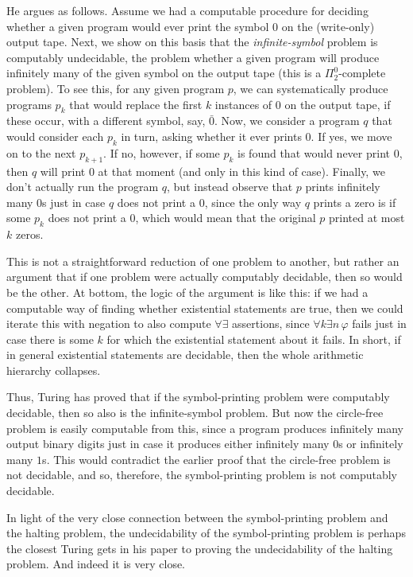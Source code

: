 \documentclass{amsart}
\begin{document}
He argues as follows. Assume we had a computable procedure for deciding whether a given program would ever print the symbol 0 on the (write-only) output tape. Next, we show on this basis that the \emph{infinite-symbol} problem is computably undecidable, the problem whether a given program will produce infinitely many of the given symbol on the output tape (this is a $\Pi^0_2$-complete problem). To see this, for any given program $p$, we can systematically produce programs $p_k$ that would replace the first $k$ instances of $0$ on the output tape, if these occur, with a different symbol, say, $\bar 0$. Now, we consider a program $q$ that  would consider each $p_k$ in turn, asking whether it ever prints $0$. If yes, we move on to the next $p_{k+1}$. If no, however, if some $p_k$ is found that would never print $0$, then $q$ will print 0 at that moment (and only in this kind of case). Finally, we don't actually run the program $q$, but instead observe that $p$ prints infinitely many 0s just in case $q$ does not print a $0$, since the only way $q$ prints a zero is if some $p_k$ does not print a $0$, which would mean that the original $p$ printed at most $k$ zeros. 

This is not a straightforward reduction of one problem to another, but rather an argument that if one problem were actually computably decidable, then so would be the other. At bottom, the logic of the argument is like this: if we had a computable way of finding whether existential statements are true, then we could iterate this with negation to also compute $\forall\exists$ assertions, since $\forall k\exists n\,\varphi$ fails just in case there is some $k$ for which the existential statement about it fails. In short, if in general existential statements are decidable, then the whole arithmetic hierarchy collapses. 

Thus, Turing has proved that if the symbol-printing problem were computably decidable, then so also is the infinite-symbol problem. But now the circle-free problem is easily computable from this, since a program produces infinitely many output binary digits just in case it produces either infinitely many $0$s or infinitely many $1$s. This would contradict the earlier proof that the circle-free problem is not decidable, and so, therefore, the symbol-printing problem is not computably decidable. 

In light of the very close connection between the symbol-printing problem and the halting problem, the undecidability of the symbol-printing problem is  perhaps the closest Turing gets in his paper to proving the undecidability of the halting problem. And indeed it is very close.
\end{document}
